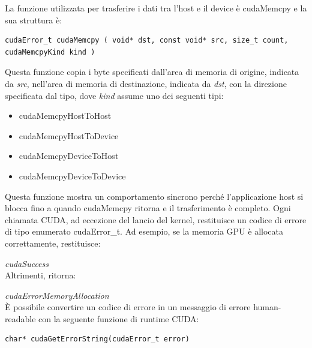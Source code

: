 La funzione utilizzata per trasferire i dati tra l'host e il device è cudaMemcpy e la sua struttura è:
\begin{lstlisting}[label=code:cudaMemcpy_def]
cudaError_t cudaMemcpy ( void* dst, const void* src, size_t count, cudaMemcpyKind kind )
\end{lstlisting}
Questa funzione copia i byte specificati dall'area di memoria di origine, indicata da \emph{src}, nell'area di memoria di destinazione, indicata da \emph{dst}, con la direzione specificata dal tipo, dove \emph{kind} assume uno dei seguenti tipi:
\begin{itemize}
	\item cudaMemcpyHostToHost
	\item cudaMemcpyHostToDevice
	\item cudaMemcpyDeviceToHost
	\item cudaMemcpyDeviceToDevice
\end{itemize}
Questa funzione mostra un comportamento sincrono perché l'applicazione host si blocca fino a quando cudaMemcpy ritorna e il trasferimento è completo. Ogni chiamata CUDA, ad eccezione del lancio del kernel, restituisce un codice di errore di tipo enumerato cudaError\_t. Ad esempio, se la memoria GPU è allocata correttamente, restituisce:

\textit{cudaSuccess}\\
Altrimenti, ritorna:

\textit{cudaErrorMemoryAllocation}\\
È possibile convertire un codice di errore in un messaggio di errore human-readable con la seguente funzione di runtime CUDA:
\begin{lstlisting}[label=code:cudaGetErrorString_def]
char* cudaGetErrorString(cudaError_t error)
\end{lstlisting}

